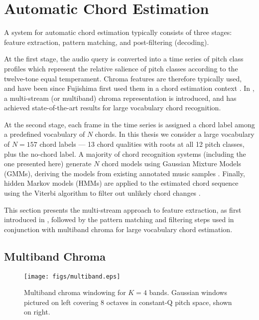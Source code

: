  
 \section{Automatic Chord Estimation}
 \label{sec:chordestimation}
 
A system for automatic chord estimation typically consists of three stages:
feature extraction, pattern matching, and post-filtering (decoding).

At the first stage, the audio query is converted into a time series of
pitch class profiles which represent the relative salience of
pitch classes according to the twelve-tone equal temperament. Chroma features are therefore typically used, and have been since Fujishima first used them in a chord estimation context \cite{fujishima1999realtime}. In \cite{cho2013mirex}, a multi-stream (or multiband) chroma representation is introduced, and has achieved state-of-the-art results for large vocabulary chord recognition.

At the second stage, each frame in the time series is assigned
a chord label among a predefined vocabulary of $N$ chords. In this thesis we consider a large vocabulary of $N = 157$ chord labels --- 13 chord qualities with roots at all 12 pitch classes, plus the no-chord label.  A majority of chord recognition systems (including the one presented here) generate $N$ chord models using Gaussian Mixture Models (GMMs), deriving the models from existing annotated music samples \cite{lee2006automatic}. Finally, hidden Markov models (HMMs) are applied to the estimated chord sequence using the Viterbi algorithm to filter out unlikely chord changes \cite{papadopoulos2007large}.

This section presents the multi-stream approach to feature extraction,
as first introduced in \cite{cho2013mirex}, followed by the pattern matching and filtering steps used in conjunction with multiband chroma for large vocabulary chord estimation.

\subsection{Multiband Chroma}
\label{sec:multibandchroma}

\begin{figure*}[!tbp]
\centering
\texttt{[image: figs/multiband.eps]}
\caption{Multiband chroma windowing for $K=4$ bands. Gaussian windows pictured on left covering 8 octaves in constant-Q pitch space, shown on right.}
\label{fig:multiband}
\end{figure*}

